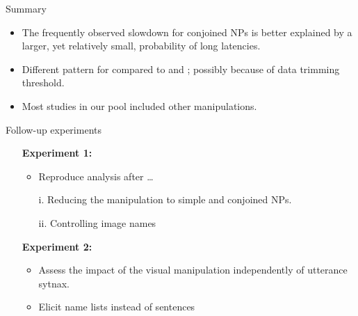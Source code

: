 \begin{frame}{Summary}

\begin{itemize}
	\item The frequently observed slowdown for conjoined NPs is better explained by a larger, yet relatively small, probability of long latencies.
	\item Different pattern for \textcite{hardy2019age,hardy2020healthy} compared to  \textcite{martin2010planning} and \textcite{roeser2019advance}; possibly because of data trimming threshold.
	\item Most studies in our pool included other manipulations.
\end{itemize}
\end{frame}

\begin{frame}{Follow-up experiments}

\setlength{\leftmargini}{0.5cm}
\setlength{\leftmarginii}{0.5cm}
\begin{itemize}
	\item[] \textbf{Experiment 1:} 
	\begin{itemize}
		\item Reproduce analysis after \dots
		\item[i.] Reducing the manipulation to simple and conjoined NPs.
		\item[ii.] Controlling image names
	\end{itemize}
	\item[] \textbf{Experiment 2:} 
	\begin{itemize}
		\item Assess the impact of the visual manipulation independently of utterance sytnax.
		\item Elicit name lists instead of sentences \parencite[as in][]{martin2010planning}
	\end{itemize}
\end{itemize}

\end{frame}